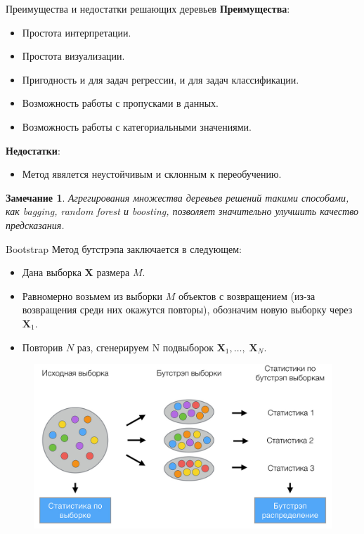 \documentclass[notheorems, handout]{beamer}
\newtheorem{remark}{Замечание}
\begin{document}
\begin{frame}{Преимущества и недостатки решающих деревьев}
\textbf{Преимущества}:
\begin{itemize}
	\item Простота интерпретации.
	\item Простота визуализации.
	\item Пригодность и для задач регрессии, и для задач классификации.
	\item Возможность работы с пропусками в данных.
	\item Возможность работы с категориальными значениями.
\end{itemize}
\par\smallskip
\textbf{Недостатки}:
\begin{itemize}
	\item Метод явялется неустойчивым и склонным к переобучению.
\end{itemize}
\par\smallskip
\begin{remark}
	Агрегирования множества деревьев решений такими способами, как bagging, random forest и boosting, позволяет значительно улучшить качество предсказания.
\end{remark}
\end{frame}

\begin{frame}{Bootstrap}
Метод бутстрэпа заключается в следующем:
\begin{itemize}
	\item Дана выборка $\mathbf{X}$ размера $M$.
	\item Равномерно возьмем из выборки $M$ объектов с возвращением (из-за возвращения среди них окажутся повторы), обозначим новую выборку через $\mathbf{X}_{1}$.
	\item Повторив $N$ раз, сгенерируем N подвыборок $\mathbf{X}_{1}{,} \dots{,}\; \mathbf{X}_{N}$.
\end{itemize}
\par\smallskip
\begin{figure}[h!]
  \includegraphics[width=0.7 \textwidth]{img/bootstrap}
\end{figure}
\end{frame}
\end{document}
